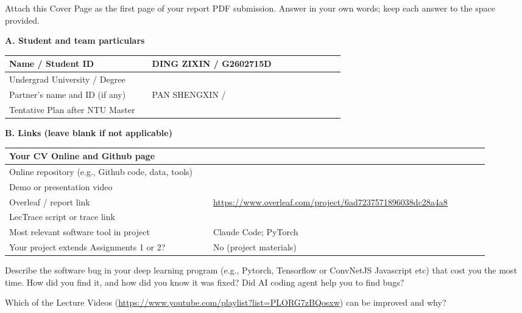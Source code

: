 \thispagestyle{empty}
\begingroup\small
\noindent Attach this Cover Page as the first page of your report PDF submission. Answer in your own words; keep each answer to the space provided.
\par\medskip\noindent\textbf{A. Student and team particulars}
\par\smallskip
\noindent\begin{tabular}{|p{0.40\linewidth}|p{0.54\linewidth}|}\hline
Name / Student ID & DING ZIXIN / G2602715D \\\hline
Undergrad University / Degree & \\\hline
Partner's name and ID (if any) & PAN SHENGXIN / \\\hline
Tentative Plan after NTU Master & \\\hline
\end{tabular}
\par\medskip\noindent\textbf{B. Links (leave blank if not applicable)}
\par\smallskip
\noindent\begin{tabular}{|p{0.40\linewidth}|p{0.54\linewidth}|}\hline
Your CV Online and Github page & \\\hline
Online repository (e.g., Github code, data, tools) & \\\hline
Demo or presentation video & \\\hline
Overleaf / report link & \url{https://www.overleaf.com/project/6ad7237571896038dc28a4a8} \\\hline
LecTrace script or trace link & \\\hline
Most relevant software tool in project & Claude Code; PyTorch \\\hline
Your project extends Assignments 1 or 2? & No (project materials) \\\hline
\end{tabular}
\par\medskip\noindent Describe the software bug in your deep learning program (e.g., Pytorch, Tensorflow or ConvNetJS Javascript etc) that cost you the most time. How did you find it, and how did you know it was fixed? Did AI coding agent help you to find bugs?
\par\vspace{0.55in}
\noindent Which of the Lecture Videos (\url{https://www.youtube.com/playlist?list=PLORG7zBQosxw}) can be improved and why?
\par\vspace{0.4in}
